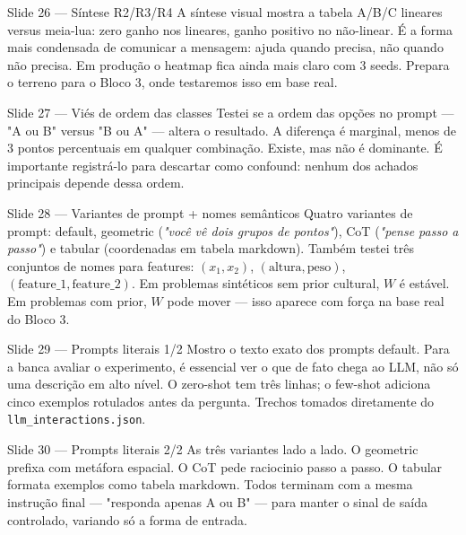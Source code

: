 \documentclass[aspectratio=169,10pt]{beamer}
\begin{document}
\begin{frame}{Slide 26 --- S\'intese R2/R3/R4}
\footnotesize
A s\'intese visual mostra a tabela A/B/C lineares versus meia-lua: zero ganho nos lineares, ganho positivo no n\~ao-linear. \'E a forma mais condensada de comunicar a mensagem: ajuda quando precisa, n\~ao quando n\~ao precisa. Em produ\c{c}\~ao o heatmap fica ainda mais claro com 3 seeds. Prepara o terreno para o Bloco 3, onde testaremos isso em base real.
\end{frame}

\begin{frame}{Slide 27 --- Vi\'es de ordem das classes}
\footnotesize
Testei se a ordem das op\c{c}\~oes no prompt --- "A ou B" versus "B ou A" --- altera o resultado. A diferen\c{c}a \'e marginal, menos de 3 pontos percentuais em qualquer combina\c{c}\~ao. Existe, mas n\~ao \'e dominante. \'E importante registr\'a-lo para descartar como confound: nenhum dos achados principais depende dessa ordem.
\end{frame}

\begin{frame}{Slide 28 --- Variantes de prompt + nomes sem\^anticos}
\footnotesize
Quatro variantes de prompt: default, geometric (\emph{"voc\^e v\^e dois grupos de pontos"}), CoT (\emph{"pense passo a passo"}) e tabular (coordenadas em tabela markdown). Tamb\'em testei tr\^es conjuntos de nomes para features: $(x_1, x_2)$, $(\text{altura}, \text{peso})$, $(\text{feature\_1}, \text{feature\_2})$. Em problemas sint\'eticos sem prior cultural, $W$ \'e est\'avel. Em problemas com prior, $W$ pode mover --- isso aparece com for\c{c}a na base real do Bloco 3.
\end{frame}

\begin{frame}{Slide 29 --- Prompts literais 1/2}
\footnotesize
Mostro o texto exato dos prompts default. Para a banca avaliar o experimento, \'e essencial ver o que de fato chega ao LLM, n\~ao s\'o uma descri\c{c}\~ao em alto n\'ivel. O zero-shot tem tr\^es linhas; o few-shot adiciona cinco exemplos rotulados antes da pergunta. Trechos tomados diretamente do \texttt{llm\_interactions.json}.
\end{frame}

\begin{frame}{Slide 30 --- Prompts literais 2/2}
\footnotesize
As tr\^es variantes lado a lado. O geometric prefixa com met\'afora espacial. O CoT pede raciocinio passo a passo. O tabular formata exemplos como tabela markdown. Todos terminam com a mesma instru\c{c}\~ao final --- "responda apenas A ou B" --- para manter o sinal de sa\'ida controlado, variando s\'o a forma de entrada.
\end{frame}
\end{document}
